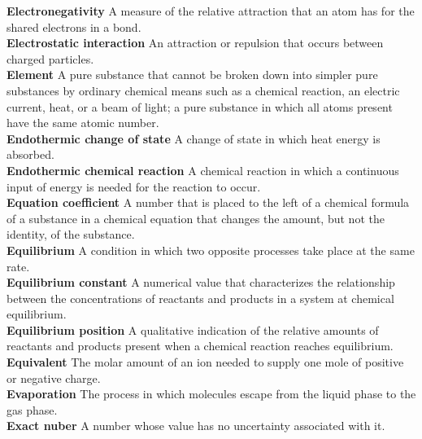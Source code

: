 \documentclass[10pt, roman]{article}
\begin{document}
\begin{minipage}[c]{0.30\textwidth}
\textbf{Electronegativity} A measure of the relative attraction that an atom has for the shared electrons in a bond. \\
\textbf{Electrostatic interaction} An attraction or repulsion that occurs between charged particles. \\
\textbf{Element} A pure substance that cannot be broken down into simpler pure substances by ordinary chemical means such as a chemical reaction, an electric current, heat, or a beam of light; a pure substance in which all atoms present have the same atomic number. \\
\textbf{Endothermic change of state} A change of state in which heat energy is absorbed. \\
\textbf{Endothermic chemical reaction} A chemical reaction in which a continuous input of energy is needed for the reaction to occur. \\
\textbf{Equation coefficient} A number that is placed to the left of a chemical formula of a substance in a chemical equation that changes the amount, but not the identity, of the substance. \\
\textbf{Equilibrium} A condition in which two opposite processes take place at the same rate. \\
\textbf{Equilibrium constant} A numerical value that characterizes the relationship between the concentrations of reactants and products in a system at chemical equilibrium. \\
\textbf{Equilibrium position} A qualitative indication of the relative amounts of reactants and products present when a chemical reaction reaches equilibrium. \\
\textbf{Equivalent} The molar amount of an ion needed to supply one mole of positive or negative charge. \\
\textbf{Evaporation} The process in which molecules escape from the liquid phase to the gas phase. \\
\textbf{Exact nuber} A number whose value has no uncertainty associated with it. \\
\end{minipage}%
\hfill
\end{document}

